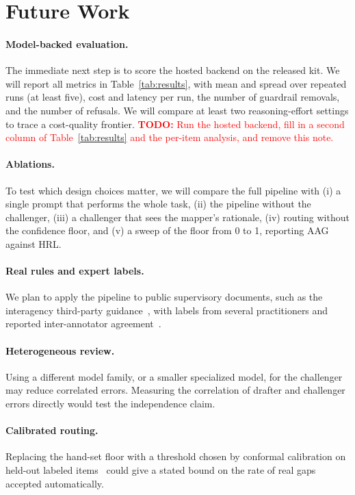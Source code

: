 \documentclass[sigconf,review,anonymous]{acmart}
\newcommand{\todo}[1]{\textcolor{red}{\textbf{TODO:} #1}}
\begin{document}
\section{Future Work}
\label{sec:future}

\paragraph{Model-backed evaluation.}
The immediate next step is to score the hosted backend on the released kit.
We will report all metrics in Table~\ref{tab:results}, with mean and spread
over repeated runs (at least five), cost and latency per run, the number of
guardrail removals, and the number of refusals. We will compare at least two
reasoning-effort settings to trace a cost-quality frontier.
\todo{Run the hosted backend, fill in a second column of
Table~\ref{tab:results} and the per-item analysis, and remove this note.}

\paragraph{Ablations.}
To test which design choices matter, we will compare the full pipeline with
(i) a single prompt that performs the whole task, (ii) the pipeline without
the challenger, (iii) a challenger that sees the mapper's rationale, (iv)
routing without the confidence floor, and (v) a sweep of the floor from 0 to
1, reporting AAG against HRL.

\paragraph{Real rules and expert labels.}
We plan to apply the pipeline to public supervisory documents, such as the
interagency third-party guidance~\cite{tprm2023}, with labels from several
practitioners and reported inter-annotator agreement~\cite{cohen1960kappa}.

\paragraph{Heterogeneous review.}
Using a different model family, or a smaller specialized model, for the
challenger may reduce correlated errors. Measuring the correlation of
drafter and challenger errors directly would test the independence claim.

\paragraph{Calibrated routing.}
Replacing the hand-set floor with a threshold chosen by conformal
calibration on held-out labeled items~\cite{angelopoulos2021conformal} could
give a stated bound on the rate of real gaps accepted automatically.
\end{document}
